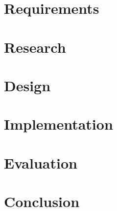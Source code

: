 \documentclass{l3proj}
\begin{document}



\chapter{Requirements}
\label{requirements}


\chapter{Research}
\label{research}





\chapter{Design}
\label{design}



\chapter{Implementation}
\label{implementation}



\chapter{Evaluation}
\label{evaluation}


\chapter{Conclusion}
\label{conclusion}
\end{document}

